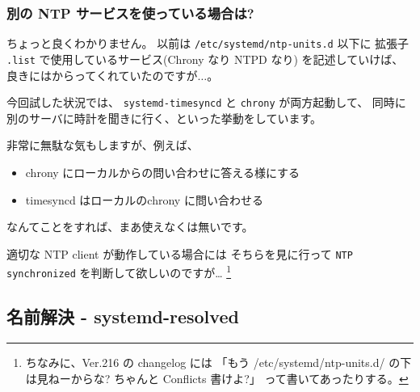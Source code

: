\documentclass[mingoth,a4paper]{jsarticle}
\begin{document}
\subsubsection{別の NTP サービスを使っている場合は?}

ちょっと良くわかりません。
以前は \verb|/etc/systemd/ntp-units.d| 以下に
拡張子 \verb|.list| で使用しているサービス(Chrony なり NTPD なり) を記述していけば、
良きにはからってくれていたのですが$\dots$。

今回試した状況では、
\verb|systemd-timesyncd| と \verb|chrony| が両方起動して、
同時に別のサーバに時計を聞きに行く、といった挙動をしています。

非常に無駄な気もしますが、例えば、
\begin{itemize}
\item %
  chrony にローカルからの問い合わせに答える様にする
\item %
  timesyncd はローカルのchrony に問い合わせる
\end{itemize}
なんてことをすれば、まあ使えなくは無いです。

適切な NTP client が動作している場合には
そちらを見に行って \verb|NTP synchronized| を判断して欲しいのですが…
\footnote{%
ちなみに、Ver.216 の changelog には
「もう /etc/systemd/ntp-units.d/ の下は見ねーからな? ちゃんと Conflicts 書けよ?」
って書いてあったりする。
}

\subsection{名前解決 - systemd-resolved}
\end{document}
